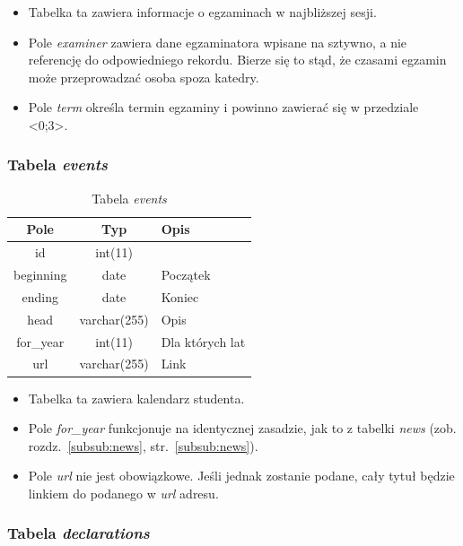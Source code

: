 \documentclass[a4paper,12pt,oneside]{report}
\begin{document}
\begin{itemize}
  \item Tabelka ta zawiera informacje o egzaminach w najbliższej sesji.
  \item Pole \emph{examiner} zawiera dane egzaminatora wpisane na sztywno, a nie referencję do odpowiedniego rekordu. Bierze się to stąd, że czasami egzamin może przeprowadzać osoba spoza katedry.
  \item Pole \emph{term} określa termin egzaminy i powinno zawierać się w przedziale <0;3>.
\end{itemize}

\newpage
\subsubsection{Tabela \emph{events}}
\label{subsub:events}

\begin{table}[h]
  \centering
  \begin{tabular}{|c|c|l|}\hline
  Pole & Typ & Opis \\\hline
  id   & int(11)   & \\
  beginning  & date         & Początek \\
  ending     & date         & Koniec \\
  head       & varchar(255) & Opis \\
  for\_year  & int(11)      & Dla których lat \\
  url        & varchar(255) & Link \\\hline
  \end{tabular}
  \caption{Tabela \emph{events}\label{tab:events}}
\end{table}

\begin{itemize}
  \item Tabelka ta zawiera kalendarz studenta.
  \item Pole \emph{for\_year} funkcjonuje na identycznej zasadzie, jak to z tabelki \emph{news} (zob. rozdz.~\ref{subsub:news}, str.~\ref{subsub:news}).
  \item Pole \emph{url} nie jest obowiązkowe. Jeśli jednak zostanie podane, cały tytuł będzie linkiem do podanego w \emph{url} adresu.
\end{itemize}

\subsubsection{Tabela \emph{declarations}}
\label{subsub:declarations}
\end{document}

